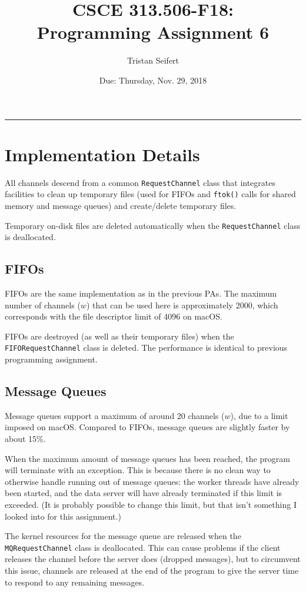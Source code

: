 \documentclass[10pt]{article}
\title{CSCE 313.506-F18: \\Programming Assignment 6}
\author{Tristan Seifert}
\date{Due: Thursday, Nov. 29, 2018}
\begin{document}
\maketitle

\hrule

\section{Implementation Details}
All channels descend from a common \texttt{RequestChannel} class that integrates facilities to clean up temporary files (used for FIFOs and \texttt{ftok()} calls for shared memory and message queues) and create/delete temporary files.

Temporary on-disk files are deleted automatically when the \texttt{RequestChannel} class is deallocated.

\subsection{FIFOs}
FIFOs are the same implementation as in the previous PAs. The maximum number of channels ($w$) that can be used here is approximately 2000, which corresponds with the file descriptor limit of 4096 on macOS.

FIFOs are destroyed (as well as their temporary files) when the \texttt{FIFORequestChannel} class is deleted. The performance is identical to previous programming assignment.

\subsection{Message Queues}
Message queues support a maximum of around 20 channels ($w$), due to a limit imposed on macOS. Compared to FIFOs, message queues are slightly faster by about 15\%.

When the maximum amount of message queues has been reached, the program will terminate with an exception. This is because there is no clean way to otherwise handle running out of message queues: the worker threads have already been started, and the data server will have already terminated if this limit is exceeded. (It is probably possible to change this limit, but that isn't something I looked into for this assignment.)

The kernel resources for the message queue are released when the \texttt{MQRequestChannel} class is deallocated. This can cause problems if the client releases the channel before the server does (dropped messages), but to circumvent this issue, channels are released at the end of the program to give the server time to respond to any remaining messages.
\end{document}
